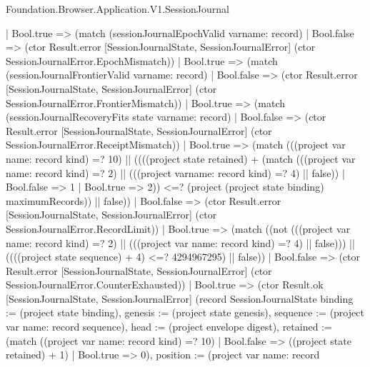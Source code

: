 \begin{lexlean}{Foundation.Browser.Application.V1.SessionJournal}
\begin{semanticmodule}
{                      | Bool.true => (match (sessionJournalEpochValid var{name: record})
                        | Bool.false => (ctor Result.error [SessionJournalState, SessionJournalError] (ctor SessionJournalError.EpochMismatch))
                        | Bool.true => (match (sessionJournalFrontierValid var{name: record})
                          | Bool.false => (ctor Result.error [SessionJournalState, SessionJournalError] (ctor SessionJournalError.FrontierMismatch))
                          | Bool.true => (match (sessionJournalRecoveryFits state var{name: record})
                            | Bool.false => (ctor Result.error [SessionJournalState, SessionJournalError] (ctor SessionJournalError.ReceiptMismatch))
                            | Bool.true => (match (((project var{
                                name: record
                              } kind) =? 10) || ((((project state retained) + (match (((project var{
                                  name: record
                                } kind) =? 2) || (((project var{name: record} kind) =? 4) || false))
                                | Bool.false => 1
                                | Bool.true => 2)) <=? (project (project state binding) maximumRecords)) || false))
                              | Bool.false => (ctor Result.error [SessionJournalState, SessionJournalError] (ctor SessionJournalError.RecordLimit))
                              | Bool.true => (match ((not (((project var{
                                  name: record
                                } kind) =? 2) || (((project var{
                                  name: record
                                } kind) =? 4) || false))) || ((((project state sequence) + 4) <=? 4294967295) || false))
                                | Bool.false => (ctor Result.error [SessionJournalState, SessionJournalError] (ctor SessionJournalError.CounterExhausted))
                                | Bool.true => (ctor Result.ok [SessionJournalState, SessionJournalError] (record SessionJournalState {binding := (project state binding), genesis := (project state genesis), sequence := (project var{
                                  name: record
                                } sequence), head := (project envelope digest), retained := (match ((project var{
                                    name: record
                                  } kind) =? 10)
                                  | Bool.false => ((project state retained) + 1)
                                  | Bool.true => 0), position := (project var{
                                  name: record
}}}
\end{semanticmodule}
\end{lexlean}

